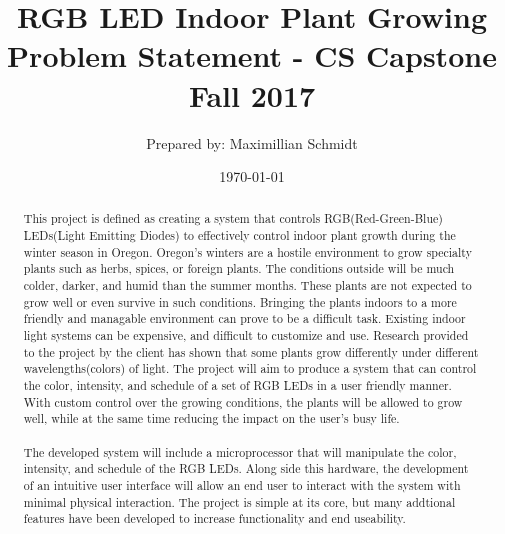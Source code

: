 \documentclass[letterpaper,10pt,draftclsnofoot,onecolumn]{article}
\title{RGB LED Indoor Plant Growing\\\large Problem Statement - CS Capstone Fall 2017}
\author{Prepared by: Maximillian Schmidt}
\date{\today}
\begin{document}
	\begin{titlingpage}
		\maketitle
		\begin{abstract}
			This project is defined as creating a system that controls RGB(Red-Green-Blue) LEDs(Light Emitting Diodes) to effectively control indoor plant growth during the winter season in Oregon.  Oregon's winters are a hostile environment to grow specialty plants such as herbs, spices, or foreign plants.  The conditions outside will be much colder, darker, and humid than the summer months.  These plants are not expected to grow well or even survive in such conditions.  Bringing the plants indoors to a more friendly and managable environment can prove to be a difficult task.  Existing indoor light systems can be expensive, and difficult to customize and use.  Research provided to the project by the client has shown that some plants grow differently under different wavelengths(colors) of light.  The project will aim to produce a system that can control the color, intensity, and schedule of a set of RGB LEDs in a user friendly manner.  With custom control over the growing conditions, the plants will be allowed to grow well, while at the same time reducing the impact on the user's busy life.
\\
\\  
The developed system will include a microprocessor that will manipulate the color, intensity, and schedule of the RGB LEDs.  Along side this hardware, the development of an intuitive user interface will allow an end user to interact with the system with minimal physical interaction.  The project is simple at its core, but many addtional features have been developed to increase functionality and end useability.  
		\end{abstract}
	\end{titlingpage}

\end{document}
